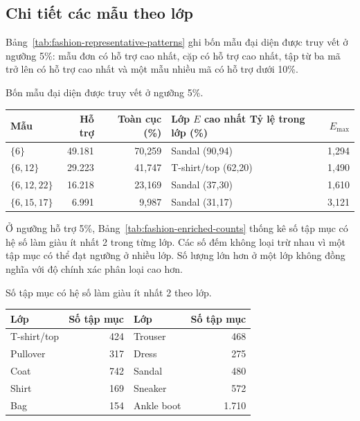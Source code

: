 \documentclass[conference,a4paper]{IEEEtran}
\makeatletter
\newenvironment{reporttable}{\par\medskip\noindent\begin{minipage}{\columnwidth}\def\@captype{table}\centering}{\end{minipage}\par\medskip}
\makeatother
\begin{document}
\subsection{Chi tiết các mẫu theo lớp}

Bảng~\ref{tab:fashion-representative-patterns} ghi bốn mẫu đại
diện được truy vết ở ngưỡng 5\%: mẫu đơn có hỗ trợ cao nhất, cặp
có hỗ trợ cao nhất, tập từ ba mã trở lên có hỗ trợ cao nhất và một
mẫu nhiều mã có hỗ trợ dưới 10\%.

\begin{reporttable}
\caption{Bốn mẫu đại diện được truy vết ở ngưỡng 5\%.}
\label{tab:fashion-representative-patterns}
\scriptsize
\setlength{\tabcolsep}{2pt}
\begin{tabular}{@{}l r r l r@{}}\toprule
Mẫu & Hỗ trợ & Toàn cục (\%) & \shortstack{Lớp $E$ cao nhất\\Tỷ lệ trong lớp (\%)} & $E_{\max}$ \\\midrule
$\{6\}$ & 49.181 & 70,259 & Sandal (90,94) & 1,294 \\
$\{6,12\}$ & 29.223 & 41,747 & T-shirt/top (62,20) & 1,490 \\
$\{6,12,22\}$ & 16.218 & 23,169 & Sandal (37,30) & 1,610 \\
$\{6,15,17\}$ & 6.991 & 9,987 & Sandal (31,17) & 3,121 \\\bottomrule
\end{tabular}
\end{reporttable}

Ở ngưỡng hỗ trợ 5\%, Bảng~\ref{tab:fashion-enriched-counts}
thống kê số tập mục có hệ số làm giàu ít nhất 2 trong từng lớp.
Các số đếm không loại trừ nhau vì một tập mục có thể đạt ngưỡng ở
nhiều lớp. Số lượng lớn hơn ở một lớp không đồng nghĩa với độ chính
xác phân loại cao hơn.

\begin{reporttable}
\caption{Số tập mục có hệ số làm giàu ít nhất 2 theo lớp.}
\label{tab:fashion-enriched-counts}
\scriptsize
\begin{tabular}{@{}l r@{\qquad}l r@{}}\toprule
Lớp & Số tập mục & Lớp & Số tập mục \\\midrule
T-shirt/top & 424 & Trouser & 468 \\
Pullover & 317 & Dress & 275 \\
Coat & 742 & Sandal & 480 \\
Shirt & 169 & Sneaker & 572 \\
Bag & 154 & Ankle boot & 1.710 \\\bottomrule
\end{tabular}
\end{reporttable}
\end{document}

